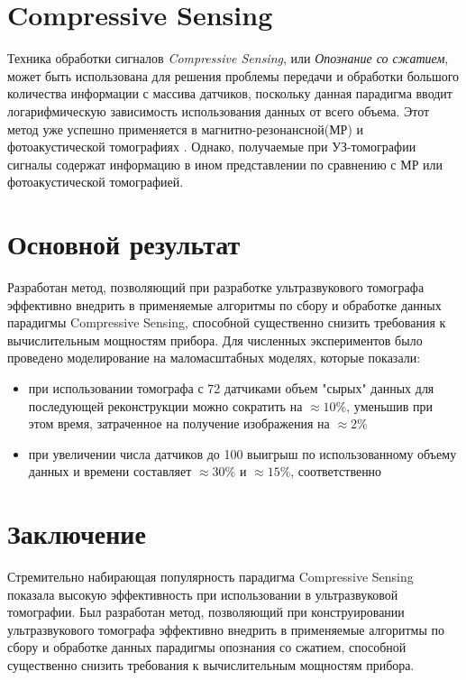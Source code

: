 \documentclass{spisok-article}
\begin{document}
\section{Compressive Sensing}
Техника обработки сигналов \textit{Compressive Sensing}, или \textit{Опознание со сжатием}, может быть использована для решения проблемы передачи и обработки большого количества информации с массива датчиков, поскольку данная парадигма вводит логарифмическую зависимость использования данных от всего объема. Этот метод уже успешно применяется в магнитно-резонансной(МР) и фотоакустической томографиях \cite{lustig2008compressed}\cite{lustig2007sparse}. Однако, получаемые при УЗ-томографии сигналы содержат информацию в ином представлении по сравнению с МР или фотоакустической томографией. 

\section{Основной результат}
Разработан метод, позволяющий при разработке ультразвукового томографа эффективно внедрить в применяемые алгоритмы по сбору и обработке данных парадигмы Compressive Sensing, способной существенно снизить требования к вычислительным мощностям прибора. 
Для численных экспериментов было проведено моделирование на маломасштабных моделях, которые показали:
\begin{itemize}
\item при использовании томографа с 72 датчиками объем "сырых" данных для последующей реконструкции можно сократить на $\approx 10$\%, уменьшив при этом время, затраченное на получение изображения на $\approx 2$\%
\item
 при увеличении числа датчиков до 100 выигрыш по использованному объему данных и времени составляет $\approx 30$\% и $\approx 15$\%, соответственно
\end{itemize}

\section{Заключение}
Стремительно набирающая популярность парадигма Compressive Sensing показала высокую эффективность при использовании в ультразвуковой томографии. Был разработан метод, позволяющий при конструировании ультразвукового томографа эффективно внедрить в применяемые алгоритмы по сбору и обработке данных парадигмы опознания со сжатием, способной существенно снизить требования к вычислительным мощностям прибора. 
\end{document}
